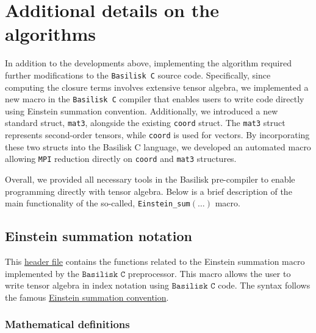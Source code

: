 \section{Additional details on the algorithms}
In addition to the developments above, implementing the algorithm required further modifications to the \texttt{Basilisk C} source code. 
Specifically, since computing the closure terms involves extensive tensor algebra, we implemented a new macro in the \texttt{Basilisk C} compiler that enables users to write code directly using Einstein summation convention. 
Additionally, we introduced a new standard struct, \texttt{mat3}, alongside the existing \texttt{coord} struct. 
The \texttt{mat3} struct represents second-order tensors, while \texttt{coord} is used for vectors. 
By incorporating these two structs into the Basilisk C language, we developed an automated macro allowing \texttt{MPI} reduction directly on \texttt{coord} and \texttt{mat3} structures. 

Overall, we provided all necessary tools in the Basilisk pre-compiler to enable programming directly with tensor algebra.
Below is a brief description of the main functionality of the so-called, \texttt{Einstein\_sum}$(\ldots)$ macro.

\subsection{Einstein summation notation}

This \href{http://basilisk.fr/src/ast/einstein_sum.h}{header file} contains the functions related to the Einstein summation macro implemented by the $\texttt{Basilisk C}$ preprocessor. This macro allows the user to write tensor algebra in index notation using $\texttt{Basilisk C}$ code. The syntax follows the famous \href{https://en.wikipedia.org/wiki/Einstein\_notation}{Einstein summation convention}.

\subsubsection{ Mathematical definitions}

